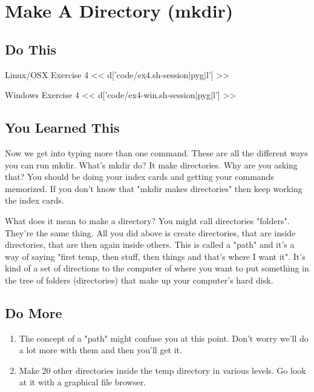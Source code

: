 \chapter{Make A Directory (mkdir)}

\section{Do This}

\begin{code}{Linux/OSX Exercise 4}
<< d['code/ex4.sh-session|pyg|l'] >>
\end{code}

\begin{code}{Windows Exercise 4}
<< d['code/ex4-win.sh-session|pyg|l'] >>
\end{code}

\section{You Learned This}

Now we get into typing more than one command.  These are all the different ways
you can run mkdir.  What's mkdir do?  It make directories.  Why are you asking
that?  You should be doing your index cards and getting your commands memorized.
If you don't know that "mkdir makes directories" then keep working the index
cards.

What does it mean to make a directory?  You might call directories "folders".  They're
the same thing.  All you did above is create directories, that are inside directories,
that are then again inside others.  This is called a "path" and it's a way of saying
"first temp, then stuff, then things and that's where I want it".  It's kind of a
set of directions to the computer of where you want to put something in the tree
of folders (directories) that make up your computer's hard disk.

\section{Do More}

\begin{enumerate}
\item The concept of a "path" might confuse you at this point.  Don't worry we'll 
    do a lot more with them and then you'll get it.
\item Make 20 other directories inside the temp directory in various levels.  Go look at it
    with a graphical file browser.
\end{enumerate}

